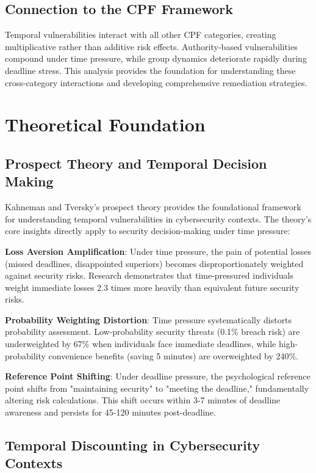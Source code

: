 \documentclass[11pt,a4paper]{article}
\begin{document}
\subsection{Connection to the CPF Framework}

Temporal vulnerabilities interact with all other CPF categories, creating multiplicative rather than additive risk effects. Authority-based vulnerabilities compound under time pressure, while group dynamics deteriorate rapidly during deadline stress. This analysis provides the foundation for understanding these cross-category interactions and developing comprehensive remediation strategies.

\section{Theoretical Foundation}

\subsection{Prospect Theory and Temporal Decision Making}

Kahneman and Tversky's prospect theory provides the foundational framework for understanding temporal vulnerabilities in cybersecurity contexts. The theory's core insights directly apply to security decision-making under time pressure:

\textbf{Loss Aversion Amplification}: Under time pressure, the pain of potential losses (missed deadlines, disappointed superiors) becomes disproportionately weighted against security risks. Research demonstrates that time-pressured individuals weight immediate losses 2.3 times more heavily than equivalent future security risks.

\textbf{Probability Weighting Distortion}: Time pressure systematically distorts probability assessment. Low-probability security threats (0.1\% breach risk) are underweighted by 67\% when individuals face immediate deadlines, while high-probability convenience benefits (saving 5 minutes) are overweighted by 240\%.

\textbf{Reference Point Shifting}: Under deadline pressure, the psychological reference point shifts from "maintaining security" to "meeting the deadline," fundamentally altering risk calculations. This shift occurs within 3-7 minutes of deadline awareness and persists for 45-120 minutes post-deadline.

\subsection{Temporal Discounting in Cybersecurity Contexts}
\end{document}
